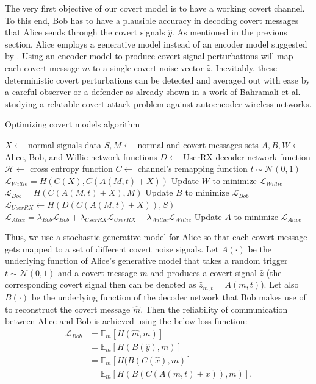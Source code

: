 The very first objective of our covert model is to have a working covert channel. To this end, Bob has to have a plausible accuracy in decoding covert messages that Alice sends through the covert signals \(\hat{y}\). As mentioned in the previous section, Alice employs a generative model instead of an encoder model suggested by \cite{mohammed2021adversarial}. Using an encoder model to produce covert signal perturbations will map each covert message \(m\) to a single covert noise vector \(\hat{z}\). Inevitably, these deterministic covert perturbations can be detected and averaged out with ease by a careful observer or a defender as already shown in a work of Bahramali et al. \cite{bahramali2021robust} studying a relatable covert attack problem against autoencoder wireless networks.
\begin{algorithm}[tp!]
	\caption{Optimizing covert models algorithm}\label{alg:cap}
	\small
	\begin{algorithmic}
		\State $X \gets$ normal signals data
		\State $S, M \gets$ normal and covert messages sets
		\State $A, B, W \gets$ Alice, Bob, and Willie network functions
		\State $D \gets$ UserRX decoder network function
		\State $\mathcal{H} \gets$ cross entropy function
		\State $C \gets$ channel's remapping function
			\State $t \sim \mathcal{N}(0, 1)$
			\State $\mathcal{L}_{Willie} = H(C(X), C(A(M, t) + X))$
			\State Update $W$ to minimize $\mathcal{L}_{Willie}$
			\State $\mathcal{L}_{Bob} = H(C(A(M, t) + X), M)$
			\State Update $B$ to minimize $\mathcal{L}_{Bob}$
			\State $\mathcal{L}_{UserRX} \gets H(D(C(A(M, t) + X)), S)$
			\State
			$\mathcal{L}_{Alice} = \lambda_{Bob} \mathcal{L}_{Bob} + \lambda_{UserRX} \mathcal{L}_{UserRX} - \lambda_{Willie} \mathcal{L}_{Willie}$
			\State Update $A$ to minimize $\mathcal{L}_{Alice}$
		\EndFor
	\end{algorithmic}
\end{algorithm}
Thus, we use a stochastic generative model for Alice so that each covert message gets mapped to a set of different covert noise signals. Let \(A(\cdot)\) be the underlying function of Alice's generative model that takes a random trigger \(t \sim \mathcal{N}(0, 1)\) and a covert message \(m\) and produces a covert signal \(\hat{z}\) (the corresponding covert signal then can be denoted as \(\hat{z}_{m, t} = A(m, t)\)). Let also  \(B(\cdot)\) be the underlying function of the decoder network that Bob makes use of to reconstruct the covert message \(\hat{m}\). Then the reliability of communication between Alice and Bob is achieved using the below loss function:
\begin{equation}
	\begin{aligned} \label{bob_loss}
	\mathcal{L}_{Bob} & = \mathbb{E}_{m}[H(\hat{m}, m)] \\
	& = \mathbb{E}_{m}[H(B(\hat{y}), m)] \\ 
	& = \mathbb{E}_{m}[H(B(C(\hat{x}), m)] \\ 
	& = \mathbb{E}_{m}[H(B(C(A(m, t) + x)), m)].
	\end{aligned}
\end{equation}


